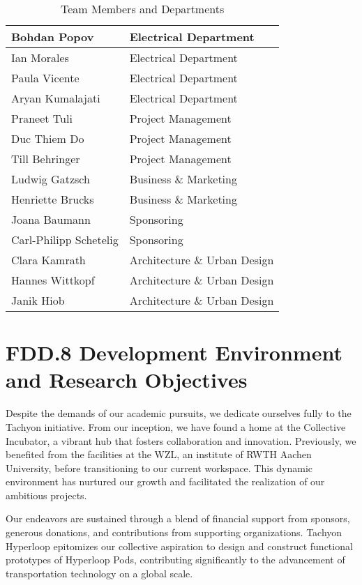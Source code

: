 \begin{table}[h]
\begin{tabular}{|l|l|}
Bohdan Popov            & Electrical Department      \\ \hline
Ian Morales             & Electrical Department      \\ \hline
Paula Vicente           & Electrical Department      \\ \hline
Aryan Kumalajati        & Electrical Department      \\ \hline
Praneet Tuli            & Project Management         \\ \hline
Duc Thiem Do            & Project Management         \\ \hline
Till Behringer          & Project Management         \\ \hline
Ludwig Gatzsch          & Business \& Marketing      \\ \hline
Henriette Brucks        & Business \& Marketing      \\ \hline
Joana Baumann           & Sponsoring                 \\ \hline
Carl-Philipp Schetelig  & Sponsoring                 \\ \hline
Clara Kamrath           & Architecture \& Urban Design \\ \hline
Hannes Wittkopf         & Architecture \& Urban Design \\ \hline
Janik Hiob              & Architecture \& Urban Design \\ \hline
\end{tabular}
\caption{Team Members and Departments}
\label{tab:team}
\end{table}

\section{FDD.8 Development Environment and Research Objectives}
Despite the demands of our academic pursuits, we dedicate ourselves fully to the Tachyon initiative. From our inception, we have found a home at the Collective Incubator, a vibrant hub that fosters collaboration and innovation. Previously, we benefited from the facilities at the WZL, an institute of RWTH Aachen University, before transitioning to our current workspace. This dynamic environment has nurtured our growth and facilitated the realization of our ambitious projects.

Our endeavors are sustained through a blend of financial support from sponsors, generous donations, and contributions from supporting organizations. Tachyon Hyperloop epitomizes our collective aspiration to design and construct functional prototypes of Hyperloop Pods, contributing significantly to the advancement of transportation technology on a global scale.

